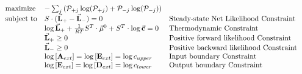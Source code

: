 \[
\begin{array}{llll}
  &  \text{maximize}  &  - \sum_j\left(\mathcal P_{+j}\log(\mathcal P_{+j}) +  \mathcal P_{-j}\log(\mathcal P_{-j})\right) &   \\
   & \text{subject to}  & S\cdot(\vec{\bf L}_+-\vec{\bf L}_-) = 0  &  \text{Steady-state Net Likelihood Constraint} \\
     &                  &\log\vec{\bf L}_+ +\frac{1}{RT}S^T\cdot\vec{\mu}^0 + S^T\cdot\log\vec{\bf c} = 0 & \text{Thermodynamic Constraint} \\
      &                   & \vec{\bf L}_+ \geq 0 & \text{Positive forward likelihood Constraint} \\
       &                  & \vec{\bf L}_- \geq 0 & \text{Positive backward likelihood Constraint} \\
        &              & \log \left[{\bf A}_{ext}\right] = \log \left[{\bf E}_{ext}\right] =  \log c_{upper} & \text{Input boundary Constraint} \\
       &               & \log \left[{\bf E}_{ext}\right] = \log \left[{\bf D}_{ext}\right] = \log c_{lower}  & \text{Output boundary Constraint} \\         
\end{array}\]